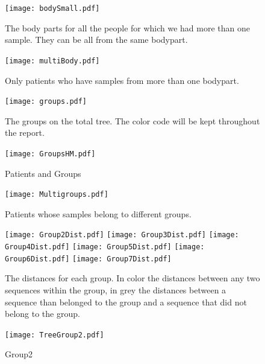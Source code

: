 \documentclass[12pt,a4paper]{article}
\begin{document}
\begin{figure}[!ht]
  \centering
    
      \texttt{[image: bodySmall.pdf]}\label{BodyS}
  \caption{The body parts for all the people for which we had more than one sample. They can be all from the same bodypart.}\label{Nseq}
\end{figure}


\begin{figure}[!ht]
  \centering
    
      \texttt{[image: multiBody.pdf]}
  \caption{Only patients who have samples from more than one bodypart.}\label{BodyM}
\end{figure}


\begin{figure}[!ht]
  \centering
    
      \texttt{[image: groups.pdf]}
  \caption{The groups on the total tree. The color code will be kept throughout the report.}\label{tree}
\end{figure}

\begin{figure}[!ht]
  \centering
    
      \texttt{[image: GroupsHM.pdf]}
  \caption{Patients and Groups}\label{Groups}
\end{figure}

\begin{figure}[!ht]
  \centering
    
      \texttt{[image: Multigroups.pdf]}
  \caption{Patients whose samples belong to different groups. }\label{GroupsS}
\end{figure}



\begin{figure}[!ht]
  \centering
    \texttt{[image: Group2Dist.pdf]}
      \texttt{[image: Group3Dist.pdf]}
       \texttt{[image: Group4Dist.pdf]}
        \texttt{[image: Group5Dist.pdf]}
         \texttt{[image: Group6Dist.pdf]}
          \texttt{[image: Group7Dist.pdf]}
        \caption{The distances for each group. In color the distances between any two sequences within the group, in grey the distances between a sequence than belonged to the group and a sequence that did not belong to the group.}\label{dist}
\end{figure}

\begin{figure}[!ht]
  \centering
    
      \texttt{[image: TreeGroup2.pdf]}
  \caption{Group2}\label{Group2Tree}
\end{figure}
\end{document}
